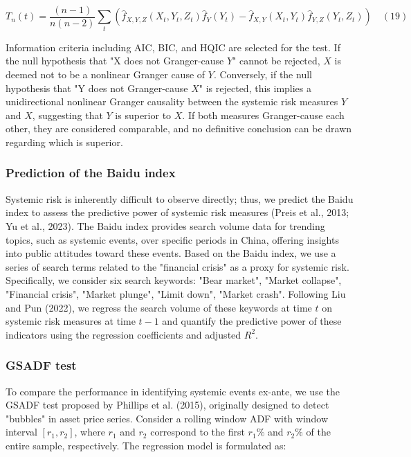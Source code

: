 \documentclass[12pt,a4paper]{article}
\begin{document}
    \[
    T_{n}(t) = \frac{(n-1)}{n(n-2)}\sum_{t}\left(\hat{f}_{X,Y,Z}(X_{t},Y_{t},Z_{t})\hat{f}_{Y}(Y_{t}) - \hat{f}_{X,Y}(X_{t},Y_{t})\hat{f}_{Y,Z}(Y_{t},Z_{t})\right) \quad (19)
    \]

    Information criteria including AIC, BIC, and HQIC are selected for the test. If the null hypothesis that "X does not Granger-cause $Y$" cannot be rejected, $X$ is deemed not to be a nonlinear Granger cause of $Y$. Conversely, if the null hypothesis that "Y does not Granger-cause $X$" is rejected, this implies a unidirectional nonlinear Granger causality between the systemic risk measures $Y$ and $X$, suggesting that $Y$ is superior to $X$. If both measures Granger-cause each other, they are considered comparable, and no definitive conclusion can be drawn regarding which is superior.

    \subsubsection{Prediction of the Baidu index}

    Systemic risk is inherently difficult to observe directly; thus, we predict the Baidu index to assess the predictive power of systemic risk measures (Preis et al., 2013; Yu et al., 2023). The Baidu index provides search volume data for trending topics, such as systemic events, over specific periods in China, offering insights into public attitudes toward these events. Based on the Baidu index, we use a series of search terms related to the "financial crisis" as a proxy for systemic risk. Specifically, we consider six search keywords: "Bear market", "Market collapse", "Financial crisis", "Market plunge", "Limit down", "Market crash". Following Liu and Pun (2022), we regress the search volume of these keywords at time $t$ on systemic risk measures at time $t-1$ and quantify the predictive power of these indicators using the regression coefficients and adjusted $R^{2}$.

    \subsubsection{GSADF test}

    To compare the performance in identifying systemic events ex-ante, we use the GSADF test proposed by Phillips et al. (2015), originally designed to detect "bubbles" in asset price series. Consider a rolling window ADF with window interval $[r_1, r_2]$, where $r_1$ and $r_2$ correspond to the first $r_1\%$ and $r_2\%$ of the entire sample, respectively. The regression model is formulated as:
\end{document}
